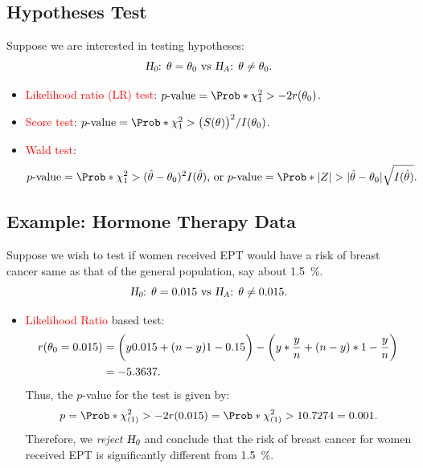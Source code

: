 \documentclass{article}\usepackage[]{graphicx}\usepackage[svgnames]{xcolor}
\let\log\relax%
\newcommand{\HN}{\textsl{H}_{\textsl{0}}}%
\newcommand{\HA}{\textsl{H}_{\textsl{A}}}%
\DeclarePairedDelimiter\abs{\lvert}{\rvert}
\begin{document}
\subsection*{Hypotheses Test}
Suppose we are interested in testing hypotheses:
\[ \text{$\HN$: $\theta=\theta_0$ vs $\HA$: $\theta\ne \theta_0$.} \]
\begin{itemize}
      \item \textcolor{Red}{Likelihood ratio (LR) test}: $ p\text{-value}=\Prob*{\chi^2_1>-2r(\theta_0)} $.
      \item \textcolor{Red}{Score test}: $ p\text{-value}=\Prob*{\chi^2_1>\bigl(S(\theta)\bigr)^2/I(\theta_0)} $.
      \item \textcolor{Red}{Wald test}:
            \[ p\text{-value}=\Prob*{\chi^2_1>(\hat{\theta}-\theta_0)^2 I(\hat{\theta})}\text{, or }
                  p\text{-value}=\Prob*{\abs{Z}>\abs{\hat{\theta}-\theta_0}\sqrt{I(\hat{\theta})}}. \]
\end{itemize}
\subsection*{Example: Hormone Therapy Data}
Suppose we wish to test if women received EPT would have a risk of breast
cancer same as that of the general population, say about \qty{1.5}{\percent}.
\[ \text{$\HN$: $\theta=0.015$ vs $\HA$: $\theta\ne 0.015$.} \]
\begin{itemize}
      \item \textcolor{Red}{Likelihood Ratio} based test:
            \begin{align*}
                  r(\theta_0=0.015)
                   & =\biggl(y\log{0.015}+(n-y)\log{1-0.15}\biggr)-\biggl(y\log*{\frac{y}{n}}+(n-y)\log*{1-\frac{y}{n} }\biggr) \\
                   & =-5.3637.
            \end{align*}
            Thus, the $ p $-value for the test is given by:
            \[ p=\Prob*{\chi^2_{(1)}>-2r(0.015)}=\Prob*{\chi^2_{(1)}>10.7274}=0.001. \]
            Therefore, we \emph{reject} $ \HN $ and conclude that the risk of breast cancer for women received EPT is
            significantly different from \qty{1.5}{\percent}.
\end{itemize}
\end{document}
